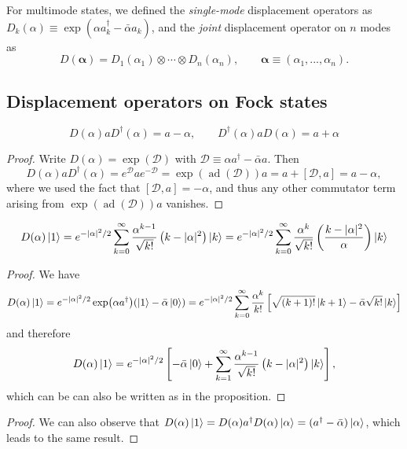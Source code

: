 \documentclass[a4paper]{report}
\newcommand{\on}[1]{\operatorname{#1}}
\newcommand{\bs}[1]{\boldsymbol{#1}}
\newcommand{\calD}{{\mathcal{D}}}
\begin{document}
\begin{defn}
	For multimode states, we defined the \emph{single-mode} displacement operators as
	$D_k(\alpha)\equiv\exp(\alpha a^\dagger_k-\bar\alpha a_k)$,
	and the \emph{joint} displacement operator on $n$ modes as
	\begin{equation}
		D(\bs\alpha)
		= D_1(\alpha_1)\otimes\cdots\otimes D_n(\alpha_n),
		\qquad \bs\alpha\equiv (\alpha_1,...,\alpha_n).
	\end{equation}
\end{defn}

\subsection{Displacement operators on Fock states}

\begin{prop}
	\begin{equation}
		D(\alpha) a D^\dagger(\alpha) = a - \alpha,
		\qquad D^\dagger(\alpha) a D(\alpha) = a + \alpha
	\end{equation}
\end{prop}
\begin{proof}
	Write $D(\alpha)=\exp(\calD)$ with $\calD\equiv \alpha a^\dagger-\bar\alpha a$.
	Then
	\begin{equation}
		D(\alpha) a D^\dagger(\alpha)
		= e^\calD a e^{-\calD}
		= \exp(\on{ad}(\calD)) a
		= a + [\calD,a] = a-\alpha,
	\end{equation}
	where we used the fact that $[\calD,a]=-\alpha$, and thus any other commutator term arising from $\exp(\on{ad}(\calD))a$ vanishes.
\end{proof}

\begin{prop}
	\begin{equation}
		D(\alpha)\ket1
		= e^{-|\alpha|^2/2}
			\sum_{k=0}^\infty \frac{\alpha^{k-1}}{\sqrt{k!}}\left(
			k - |\alpha|^2
			\right) \ket k
		= e^{-|\alpha|^2/2}
			\sum_{k=0}^\infty \frac{\alpha^{k}}{\sqrt{k!}}
			\left( \frac{ k - |\alpha|^2 }{ \alpha } \right) \ket k
	\end{equation}
	\label{prop:displacement_action_on_1}
\end{prop}
\begin{proof}
	We have
	\begin{equation}
		D(\alpha) \ket 1
		= e^{-|\alpha|^2/2}
		  \exp(\alpha a^\dagger) (\ket1 - \bar\alpha \ket0)
		= e^{-|\alpha|^2/2}
		  \sum_{k=0}^\infty \frac{\alpha^k}{k!} \left[
		  	\sqrt{(k+1)!}\ket{k+1}
		  	- \bar\alpha \sqrt{k!}\ket k
		  \right]
	\end{equation}
	and therefore
	\begin{equation}
		D(\alpha)\ket1
		= e^{-|\alpha|^2/2} \left[
			-\bar\alpha \ket 0
			+ \sum_{k=1}^\infty \frac{\alpha^{k-1}}{\sqrt{k!}}\left(
			k - |\alpha|^2
			\right) \ket k
		\right],
	\end{equation}
	which can be can also be written as in the proposition.
\end{proof}
\begin{proof}
	We can also observe that $D(\alpha)\ket1=D(\alpha) a^\dagger D(\alpha)\ket\alpha=(a^\dagger-\bar\alpha)\ket\alpha$, which leads to the same result.
\end{proof}
\end{document}
